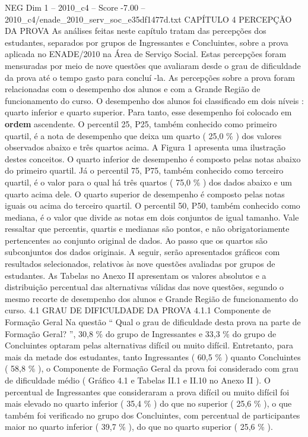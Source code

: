 \begin{textsample}{NEG Dim 1 – 2010\_c4 – Score -7.00 – 2010\_c4/enade\_2010\_serv\_soc\_e35df1477d.txt}  \label{ex:f1_neg_039}
CAPÍTULO 4 PERCEPÇÃO DA PROVA As análises feitas neste capítulo tratam das percepções dos estudantes, separados por grupos de Ingressantes e Concluintes, sobre a prova aplicada no ENADE/2010 na Área de Serviço Social.
Estas percepções foram mensuradas por meio de nove questões que avaliaram desde o grau de dificuldade da prova até o tempo gasto para concluí -la.
As percepções sobre a prova foram relacionadas com o desempenho dos alunos e com a Grande Região de funcionamento do curso.
O desempenho dos alunos foi classificado em dois níveis : quarto inferior e quarto superior.
Para tanto, esse desempenho foi colocado em \textbf{ordem} ascendente.
O percentil 25, P25, também conhecido como primeiro quartil, é a nota de desempenho que deixa um quarto ( 25,0 \% ) dos valores observados abaixo e três quartos acima.
A Figura 1 apresenta uma ilustração destes conceitos.
O quarto inferior de desempenho é composto pelas notas abaixo do primeiro quartil.
Já o percentil 75, P75, também conhecido como terceiro quartil, é o valor para o qual há três quartos ( 75,0 \% ) dos dados abaixo e um quarto acima dele.
O quarto superior de desempenho é composto pelas notas iguais ou acima do terceiro quartil.
O percentil 50, P50, também conhecido como mediana, é o valor que divide as notas em dois conjuntos de igual tamanho.
Vale ressaltar que percentis, quartis e medianas são pontos, e não obrigatoriamente pertencentes ao conjunto original de dados.
Ao passo que os quartos são subconjuntos dos dados originais.
A seguir, serão apresentados gráficos com resultados selecionados, relativos às nove questões avaliadas por grupos de estudantes.
As Tabelas no Anexo II apresentam os valores absolutos e a distribuição percentual das alternativas válidas das nove questões, segundo o mesmo recorte de desempenho dos alunos e Grande Região de funcionamento do curso. 4.1 GRAU DE DIFICULDADE DA PROVA 4.1.1 Componente de Formação Geral Na questão “ Qual o grau de dificuldade desta prova na parte de Formação Geral? ”, 30,8 \% do grupo de Ingressantes e 33,3 \% do grupo de Concluintes optaram pelas alternativas difícil ou muito difícil.
Entretanto, para mais da metade dos estudantes, tanto Ingressantes ( 60,5 \% ) quanto Concluintes ( 58,8 \% ), o Componente de Formação Geral da prova foi considerado com grau de dificuldade médio ( Gráfico 4.1 e Tabelas II.1 e II.10 no Anexo II ).
O percentual de Ingressantes que consideraram a prova difícil ou muito difícil foi mais elevado no quarto inferior ( 35,4 \% ) do que no superior ( 25,6 \% ), o que também foi verificado no grupo dos Concluintes, com percentual de participantes maior no quarto inferior ( 39,7 \% ), do que no quarto superior ( 25,6 \% ).

\end{textsample}

